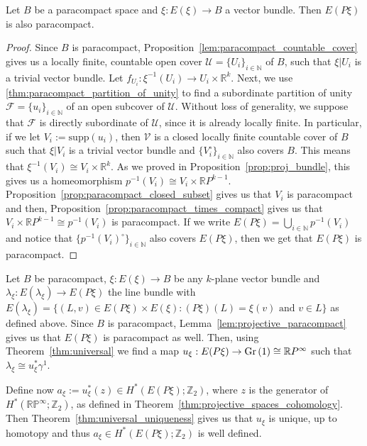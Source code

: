 \begin{lemma}\label{lem:projective_paracompact} Let $B$ be a paracompact space and $\xi:E(\xi)\to B$ a vector bundle. Then $E(P\xi)$ is also paracompact.
\end{lemma}
\begin{proof} Since $B$ is paracompact, Proposition~\ref{lem:paracompact_countable_cover} gives us a locally finite, countable open cover $\mathcal{U}=\{U_i\}_{i\in\mathbb{N}}$ of $B$, such that $\xi|U_i$ is a trivial vector bundle. Let $f_{U_i}:\xi^{-1}(U_i)\to U_i\times\mathbb{R}^k$. Next, we use \ref{thm:paracompact_partition_of_unity} to find a subordinate partition of unity $\mathcal{F}=\{u_i\}_{i\in\mathbb{N}}$ of an open subcover of $\mathcal{U}$. Without loss of generality, we suppose that $\mathcal{F}$ is directly subordinate of $\mathcal{U}$, since it is already locally finite. In particular, if we let $V_i:=\mathrm{supp}(u_i)$, then $\mathcal{V}$ is a closed locally finite countable cover of $B$ such that $\xi|V_i$ is a trivial vector bundle and $\{V_i^{\circ}\}_{i\in\mathbb{N}}$ also covers $B$. This means that $\xi^{-1}(V_i)\cong V_i\times\mathbb{R}^k$. As we proved in Proposition~\ref{prop:proj_bundle}, this gives us a homeomorphism $p^{-1}(V_i)\cong V_i\times\mathbb{R}P^{k-1}$. Proposition~\ref{prop:paracompact_closed_subset} gives us that $V_i$ is paracompact and then, Proposition~\ref{prop:paracompact_times_compact} gives us that $V_i\times\mathbb{R}P^{k-1}\cong p^{-1}(V_i)$ is paracompact. If we write $E(P\xi)=\bigcup_{i\in\mathbb{N}}p^{-1}(V_i)$ and notice that $\{p^{-1}(V_i)^{\circ}\}_{i\in\mathbb{N}}$ also covers $E(P\xi)$, then we get that $E(P\xi)$ is paracompact.%
\end{proof}

\begin{remark} Let $B$ be paracompact, $\xi:E(\xi)\to B$ be any $k$-plane vector bundle and $\lambda_{\xi}:E(\lambda_{\xi})\to E(P\xi)$ the line bundle with $E(\lambda_{\xi})=\big\{(L,v)\in E(P\xi)\times E(\xi):(P\xi)(L)=\xi(v)\text{ and }v\in L\big\}$ as defined above. Since $B$ is paracompact, Lemma~\ref{lem:projective_paracompact} gives us that $E(P\xi)$ is paracompact as well. Then, using Theorem~\ref{thm:universal} we find a map $u_{\xi}:E(P\xi)\to\Gr{1}\cong\mathbb{R}P^{\infty}$ such that $\lambda_{\xi}\cong u_{\xi}^*\gamma^1$.
\begin{center}
\end{center}
Define now $a_{\xi}:=u_{\xi}^*(z)\in H^*(E(P\xi);\mathbb{Z}_2)$, where $z$ is the generator of $H^*(\mathbb{RP}^{\infty};\mathbb{Z}_2)$, as defined in Theorem~\ref{thm:projective_spaces_cohomology}. Then Theorem~\ref{thm:universal_uniqueness} gives us that $u_{\xi}$ is unique, up to homotopy and thus $a_{\xi}\in H^*(E(P\xi);\mathbb{Z}_2)$ is well defined.
\end{remark}


